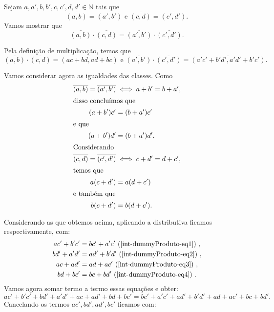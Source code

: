 \documentclass[../main.tex]{subfiles}
\begin{document}
\begin{dem}
    Sejam $a,a',b,b',c,c',d,d' \in \mathbb{N} $ tais que 
    \[ \overline{(a,b)} = \overline{(a',b')} \text{ e } \overline{(c,d)} = \overline{(c',d')}.\]
    Vamos mostrar que
    \[ \overline{(a,b)} \cdot \overline{(c,d)} = \overline{(a',b')} \cdot \overline{(c',d')}. \]

    Pela definição de multiplicação, temos que 
    \[ \overline{(a,b)} \cdot \overline{(c,d)} = \overline{(ac+bd,ad+bc)} \text{ e } \overline{(a',b')} \cdot \overline{(c',d')} = \overline{(a'c'+b'd',a'd'+b'c')}.\]
    
    Vamos considerar agora as igualdades das classes. Como 
    \begin{align}
        \overline{(a,b)} = \overline{(a',b')} &\iff a + b' = b + a', \nonumber \\        \shortintertext{disso concluímos que}  
        (a + b')c' &= (b + a')c' \label{int-dummyProduto-eq1} \\         \shortintertext{e que} 
        (a + b')d' &= (b + a')d' . \label{int-dummyProduto-eq2} \\        \shortintertext{Considerando} 
        \overline{(c,d)} = \overline{(c',d')} &\iff c + d' = d + c', \nonumber \\        \shortintertext{temos que}  
        a(c + d') &= a(d + c') \label{int-dummyProduto-eq3} \\        \shortintertext{e também que}  
        b(c + d') &= b(d + c'). \label{int-dummyProduto-eq4}
    \end{align}
    
    Considerando as  que obtemos acima, aplicando a distributiva ficamos respectivamente, com:
    \begin{align*}
        ac'+b'c' &= bc'+a'c' \text{ (\Cref{int-dummyProduto-eq1}) }, \\
        bd'+a'd' &= ad'+b'd' \text{ (\Cref{int-dummyProduto-eq2}) },\\
        ac+ad'   &= ad+ac' \text{ (\Cref{int-dummyProduto-eq3}) },\\
        bd+bc'   &= bc+bd' \text{ (\Cref{int-dummyProduto-eq4}) }.
    \end{align*}
    Vamos agora somar termo a termo essas equações e obter:
    \[ ac'+b'c' + bd'+a'd' + ac+ad' + bd+bc' = bc'+a'c' + ad'+b'd' + ad+ac' + bc+bd'. \]
    Cancelando os termos $ac', bd', ad', bc'$ ficamos com:
    

\end{dem}
\end{document}
